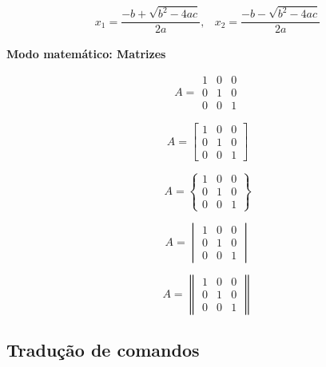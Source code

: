 \documentclass[12pt]{article}
\begin{document}
\begin{equation}
	\begin{array}{cc}
		x_1 = \dfrac{-b + \sqrt{b^2 -4ac}}{2a}, & 
		x_2 = \dfrac{-b - \sqrt{b^2 -4ac}}{2a}
	\end{array}
\end{equation}


\textbf{Modo matemático: Matrizes}

\begin{equation}
A = \begin{matrix}
	1 & 0  & 0  \\
	0 & 1  & 0  \\
	0 & 0  & 1 
   \end{matrix}
\end{equation}

\begin{equation}
	A = \begin{bmatrix}
		1 & 0  & 0  \\
		0 & 1  & 0  \\
		0 & 0  & 1 
	\end{bmatrix}
\end{equation}

\begin{equation}
	A = \begin{Bmatrix}
		1 & 0  & 0  \\
		0 & 1  & 0  \\
		0 & 0  & 1 
	\end{Bmatrix}
\end{equation}

\begin{equation}
	A = \begin{vmatrix}
		1 & 0  & 0  \\
		0 & 1  & 0  \\
		0 & 0  & 1 
	\end{vmatrix}
\end{equation}

\begin{equation}
	A = \begin{Vmatrix}
		1 & 0  & 0  \\
		0 & 1  & 0  \\
		0 & 0  & 1 
	\end{Vmatrix}
\end{equation}

\subsection[Tradução de Comandos]{Tradução de comandos}
\end{document}
